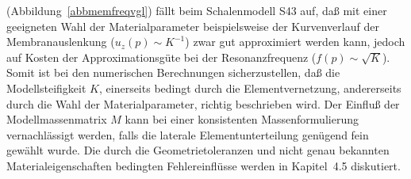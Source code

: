 (Abbildung~\ref{abbmemfreqvgl}) fällt beim Schalenmodell S43 auf, daß mit
einer geeigneten Wahl der Materialparameter beispielsweise der Kurvenverlauf
der Membranauslenkung ($u_{z}(p) \sim K^{-1}$) zwar gut approximiert
werden kann, jedoch auf Kosten der Approximationsgüte bei der
Resonanzfrequenz ($f(p) \sim \sqrt{K}$).
Somit ist bei den numerischen Berechnungen sicherzustellen, daß die
Modellsteifigkeit $K$, einerseits bedingt durch die Elementvernetzung,
andererseits durch die Wahl der Materialparameter, richtig beschrieben wird.
Der Einfluß der Modellmassenmatrix $M$ kann bei einer konsistenten
Massenformulierung vernachlässigt werden, falls die laterale
Elementunterteilung genügend fein gewählt wurde.
Die durch die Geometrietoleranzen und nicht genau bekannten
Materialeigenschaften bedingten Fehlereinflüsse werden in Kapitel~4.5
diskutiert.
